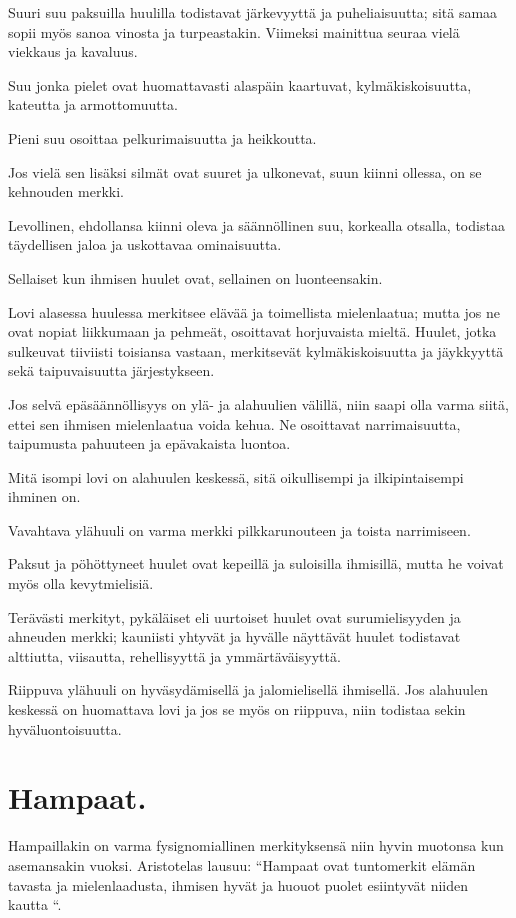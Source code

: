 \documentclass[11pt, twoside, finnish, a5paper]{book}
\begin{document}
Suuri suu paksuilla huulilla todistavat järkevyyttä
ja puheliaisuutta; sitä samaa sopii myös sanoa vinosta ja
turpeastakin. Viimeksi mainittua seuraa vielä viekkaus
ja kavaluus.

Suu jonka pielet ovat huomattavasti alaspäin kaartuvat,
kylmäkiskoisuutta, kateutta ja armottomuutta.

Pieni suu osoittaa pelkurimaisuutta ja heikkoutta.

Jos vielä sen lisäksi silmät ovat suuret ja
ulkonevat, suun kiinni ollessa, on se kehnouden merkki.

Levollinen, ehdollansa kiinni oleva ja säännöllinen
suu, korkealla otsalla, todistaa täydellisen jaloa
ja uskottavaa ominaisuutta.

Sellaiset kun ihmisen huulet ovat, sellainen on luonteensakin.
 
Lovi alasessa huulessa merkitsee elävää ja toimellista
mielenlaatua; mutta jos ne ovat nopiat liikkumaan ja
pehmeät, osoittavat horjuvaista mieltä.
Huulet, jotka sulkeuvat tiiviisti toisiansa vastaan, 
merkitsevät kylmäkiskoisuutta ja jäykkyyttä sekä
taipuvaisuutta järjestykseen.

Jos selvä epäsäännöllisyys on ylä- ja alahuulien välillä,
niin saapi olla varma siitä, ettei sen
ihmisen mielenlaatua voida kehua. Ne osoittavat
narrimaisuutta, taipumusta pahuuteen  ja epävakaista luontoa.

Mitä isompi lovi on alahuulen keskessä, sitä
oikullisempi ja ilkipintaisempi ihminen on.

Vavahtava ylähuuli on varma merkki pilkkarunouteen
ja toista narrimiseen.

Paksut ja pöhöttyneet huulet ovat kepeillä ja suloisilla
ihmisillä, mutta he voivat myös olla kevytmielisiä.

Terävästi merkityt, pykäläiset eli uurtoiset huulet
ovat surumielisyyden ja ahneuden merkki; kauniisti
yhtyvät ja hyvälle näyttävät huulet todistavat alttiutta,
viisautta, rehellisyyttä ja ymmärtäväisyyttä.

Riippuva ylähuuli on hyväsydämisellä ja jalomielisellä
ihmisellä. Jos alahuulen keskessä on huomattava lovi
ja jos se myös on riippuva, niin todistaa sekin hyväluontoisuutta.


\chapter*{Hampaat.}

Hampaillakin on varma fysignomiallinen merkityksensä
niin hyvin muotonsa kun asemansakin vuoksi.
Aristotelas lausuu:  ``Hampaat ovat tuntomerkit elämän tavasta ja mielenlaadusta, ihmisen hyvät ja huouot puolet esiintyvät niiden kautta ``.
\end{document}
